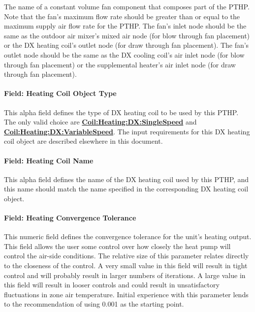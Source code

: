The name of a constant volume fan component that composes part of the PTHP. Note that the fan's maximum flow rate should be greater than or equal to the maximum supply air flow rate for the PTHP. The fan's inlet node should be the same as the outdoor air mixer's mixed air node (for blow through fan placement) or the DX heating coil's outlet node (for draw through fan placement). The fan's outlet node should be the same as the DX cooling coil's air inlet node (for blow through fan placement) or the supplemental heater's air inlet node (for draw through fan placement).

\paragraph{Field: Heating Coil Object Type}\label{field-heating-coil-object-type-4-000}

This alpha field defines the type of DX heating coil to be used by this PTHP. The only valid choice are \textbf{\hyperref[coilheatingdxsinglespeed]{Coil:Heating:DX:SingleSpeed}} and \textbf{\hyperref[coilheatingdxvariablespeed]{Coil:Heating:DX:VariableSpeed}}. The input requirements for this DX heating coil object are described elsewhere in this document.

\paragraph{Field: Heating Coil Name}\label{field-heating-coil-name-4-000}

This alpha field defines the name of the DX heating coil used by this PTHP, and this name should match the name specified in the corresponding DX heating coil object.

\paragraph{Field: Heating Convergence Tolerance}\label{field-heating-convergence-tolerance-3}

This numeric field defines the convergence tolerance for the unit's heating output. This field allows the user some control over how closely the heat pump will control the air-side conditions. The relative size of this parameter relates directly to the closeness of the control. A very small value in this field will result in tight control and will probably result in larger numbers of iterations. A large value in this field will result in looser controls and could result in unsatisfactory fluctuations in zone air temperature. Initial experience with this parameter lends to the recommendation of using 0.001 as the starting point.

